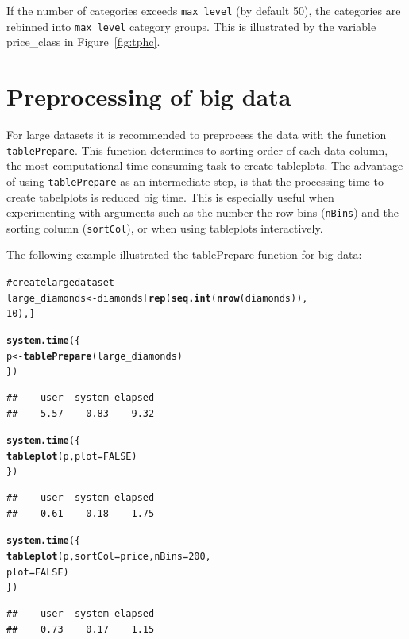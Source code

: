 \documentclass[11pt, fleqn, a4paper]{article}\usepackage{graphicx, color}
\makeatletter
\newcommand{\hlfunctioncall}[1]{\textcolor[rgb]{0.501960784313725,0,0.329411764705882}{\textbf{#1}}}%
\newcommand{\hlcomment}[1]{\textcolor[rgb]{0.180392156862745,0.6,0.341176470588235}{#1}}%
\newenvironment{kframe}{%
 \def\at@end@of@kframe{}%
 \ifinner\ifhmode%
  \def\at@end@of@kframe{\end{minipage}}%
  \begin{minipage}{\columnwidth}%
 \fi\fi%
 \def\FrameCommand##1{\hskip\@totalleftmargin \hskip-\fboxsep
 \colorbox{shadecolor}{##1}\hskip-\fboxsep
     \hskip-\linewidth \hskip-\@totalleftmargin \hskip\columnwidth}%
 \MakeFramed {\advance\hsize-\width
   \@totalleftmargin\z@ \linewidth\hsize
   \@setminipage}}%
 {\par\unskip\endMakeFramed%
 \at@end@of@kframe}
\newenvironment{knitrout}{}{} %
\makeatother
\begin{document}
If the number of categories exceeds {\tt max\_level} (by default 50), the categories are rebinned into {\tt max\_level} category groups. This is illustrated by the variable price\_class in Figure~\ref{fig:tphc}.




\section{Preprocessing of big data}

For large datasets it is recommended to preprocess the data with the function {\tt tablePrepare}. This function determines to sorting order of each data column, the most computational time consuming task to create tableplots. The advantage of using {\tt tablePrepare} as an intermediate step, is that the processing time to create tabelplots is reduced big time. This is especially useful when experimenting with arguments such as the number the row bins ({\tt nBins}) and the sorting column ({\tt sortCol}), or when using tableplots interactively.

The following example illustrated the tablePrepare function for big data:

\begin{knitrout}
\color{fgcolor}\begin{kframe}
\begin{alltt}
\hlcomment{# create large dataset}
large_diamonds <- diamonds[\hlfunctioncall{rep}(\hlfunctioncall{seq.int}(\hlfunctioncall{nrow}(diamonds)), 
    10), ]

\hlfunctioncall{system.time}(\{
    p <- \hlfunctioncall{tablePrepare}(large_diamonds)
\})
\end{alltt}
\end{kframe}

\begin{kframe}\begin{verbatim}
##    user  system elapsed 
##    5.57    0.83    9.32
\end{verbatim}
\begin{alltt}

\hlfunctioncall{system.time}(\{
    \hlfunctioncall{tableplot}(p, plot = FALSE)
\})
\end{alltt}
\begin{verbatim}
##    user  system elapsed 
##    0.61    0.18    1.75
\end{verbatim}
\begin{alltt}

\hlfunctioncall{system.time}(\{
    \hlfunctioncall{tableplot}(p, sortCol = price, nBins = 200, 
        plot = FALSE)
\})
\end{alltt}
\begin{verbatim}
##    user  system elapsed 
##    0.73    0.17    1.15
\end{verbatim}
\end{kframe}
\end{knitrout}
\end{document}

